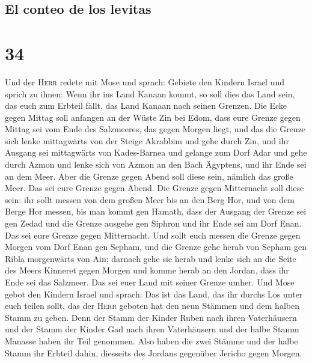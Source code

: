 \hypertarget{el-conteo-de-los-levitas}{%
\subsection{El conteo de los levitas}\label{el-conteo-de-los-levitas}}

\hypertarget{section-33}{%
\section{34}\label{section-33}}

 Und der \textsc{Herr} redete mit Mose und sprach:
 Gebiete den Kindern Israel und sprich zu ihnen: Wenn ihr
ins Land Kanaan kommt, so soll dies das Land sein, das euch zum Erbteil
fällt, das Land Kanaan nach seinen Grenzen.  Die Ecke
gegen Mittag soll anfangen an der Wüste Zin bei Edom, dass eure Grenze
gegen Mittag sei vom Ende des Salzmeeres, das gegen Morgen liegt,
 und das die Grenze sich lenke mittagwärts von der Steige
Akrabbim und gehe durch Zin, und ihr Ausgang sei mittagwärts von
Kades-Barnea und gelange zum Dorf Adar und gehe durch Azmon
 und lenke sich von Azmon an den Bach Ägyptens, und ihr
Ende sei an dem Meer.  Aber die Grenze gegen Abend soll
diese sein, nämlich das große Meer. Das sei eure Grenze gegen Abend.
 Die Grenze gegen Mitternacht soll diese sein: ihr sollt
messen von dem großen Meer bis an den Berg Hor,  und von
dem Berge Hor messen, bis man kommt gen Hamath, dass der Ausgang der
Grenze sei gen Zedad  und die Grenze ausgehe gen Siphron
und ihr Ende sei am Dorf Enan. Das sei eure Grenze gegen Mitternacht.
 Und sollt euch messen die Grenze gegen Morgen vom Dorf
Enan gen Sepham,  und die Grenze gehe herab von Sepham
gen Ribla morgenwärts von Ain; darnach gehe sie herab und lenke sich an
die Seite des Meers Kinneret gegen Morgen  und komme
herab an den Jordan, dass ihr Ende sei das Salzmeer. Das sei euer Land
mit seiner Grenze umher.  Und Mose gebot den Kindern
Israel und sprach: Das ist das Land, das ihr durchs Los unter euch
teilen sollt, das der \textsc{Herr} geboten hat den neun Stämmen und dem
halben Stamm zu geben.  Denn der Stamm der Kinder Ruben
nach ihren Vaterhäusern und der Stamm der Kinder Gad nach ihren
Vaterhäusern und der halbe Stamm Manasse haben ihr Teil genommen.
 Also haben die zwei Stämme und der halbe Stamm ihr
Erbteil dahin, diesseits des Jordans gegenüber Jericho gegen Morgen.
